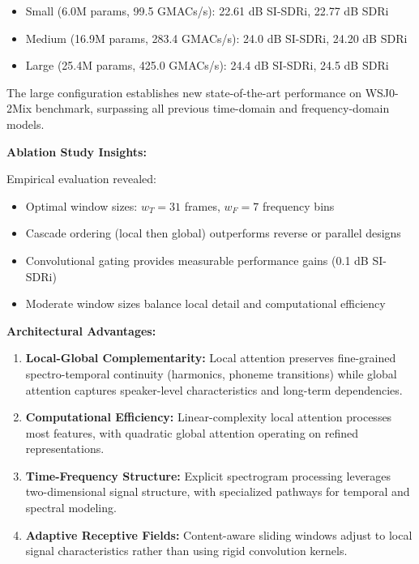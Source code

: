 \documentclass[conference]{IEEEtran}
\begin{document}
\begin{itemize}
    \item Small (6.0M params, 99.5 GMACs/s): 22.61 dB SI-SDRi, 22.77 dB SDRi
    \item Medium (16.9M params, 283.4 GMACs/s): 24.0 dB SI-SDRi, 24.20 dB SDRi
    \item Large (25.4M params, 425.0 GMACs/s): 24.4 dB SI-SDRi, 24.5 dB SDRi
\end{itemize}

The large configuration establishes new state-of-the-art performance on WSJ0-2Mix benchmark, surpassing all previous time-domain and frequency-domain models.

\textbf{Ablation Study Insights:}

Empirical evaluation revealed:
\begin{itemize}
    \item Optimal window sizes: $w_T=31$ frames, $w_F=7$ frequency bins
    \item Cascade ordering (local then global) outperforms reverse or parallel designs
    \item Convolutional gating provides measurable performance gains (0.1 dB SI-SDRi)
    \item Moderate window sizes balance local detail and computational efficiency
\end{itemize}

\textbf{Architectural Advantages:}

\begin{enumerate}
    \item \textbf{Local-Global Complementarity:} Local attention preserves fine-grained spectro-temporal continuity (harmonics, phoneme transitions) while global attention captures speaker-level characteristics and long-term dependencies.
    
    \item \textbf{Computational Efficiency:} Linear-complexity local attention processes most features, with quadratic global attention operating on refined representations.
    
    \item \textbf{Time-Frequency Structure:} Explicit spectrogram processing leverages two-dimensional signal structure, with specialized pathways for temporal and spectral modeling.
    
    \item \textbf{Adaptive Receptive Fields:} Content-aware sliding windows adjust to local signal characteristics rather than using rigid convolution kernels.
\end{enumerate}
\end{document}
